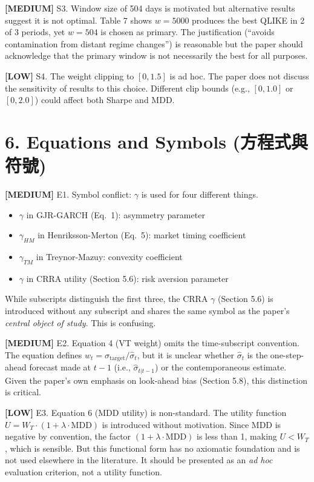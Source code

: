 \documentclass[12pt,a4paper]{article}
\newcommand{\med}[1]{\textcolor{warncolor}{\textbf{[MEDIUM]} #1}}
\newcommand{\low}[1]{\textcolor{okgreen}{\textbf{[LOW]} #1}}
\begin{document}
\med{S3. Window size of 504 days is motivated but alternative results suggest it is not optimal.} Table 7 shows $w = 5000$ produces the best QLIKE in 2 of 3 periods, yet $w = 504$ is chosen as primary. The justification (``avoids contamination from distant regime changes'') is reasonable but the paper should acknowledge that the primary window is not necessarily the best for all purposes.

\low{S4. The weight clipping to $[0, 1.5]$ is ad hoc.} The paper does not discuss the sensitivity of results to this choice. Different clip bounds (e.g., $[0, 1.0]$ or $[0, 2.0]$) could affect both Sharpe and MDD.


\section*{6. Equations and Symbols (方程式與符號)}

\med{E1. Symbol conflict: $\gamma$ is used for four different things.}
\begin{itemize}[nosep]
\item $\gamma$ in GJR-GARCH (Eq.\ 1): asymmetry parameter
\item $\gamma_{HM}$ in Henriksson-Merton (Eq.\ 5): market timing coefficient
\item $\gamma_{TM}$ in Treynor-Mazuy: convexity coefficient
\item $\gamma$ in CRRA utility (Section 5.6): risk aversion parameter
\end{itemize}
While subscripts distinguish the first three, the CRRA $\gamma$ (Section 5.6) is introduced without any subscript and shares the same symbol as the paper's \emph{central object of study}. This is confusing.

\med{E2. Equation 4 (VT weight) omits the time-subscript convention.} The equation defines $w_t = \sigma_{\text{target}} / \hat{\sigma}_t$, but it is unclear whether $\hat{\sigma}_t$ is the one-step-ahead forecast made at $t-1$ (i.e., $\hat{\sigma}_{t|t-1}$) or the contemporaneous estimate. Given the paper's own emphasis on look-ahead bias (Section 5.8), this distinction is critical.

\low{E3. Equation 6 (MDD utility) is non-standard.} The utility function $U = W_T \cdot (1 + \lambda \cdot \text{MDD})$ is introduced without motivation. Since MDD is negative by convention, the factor $(1 + \lambda \cdot \text{MDD})$ is less than 1, making $U < W_T$, which is sensible. But this functional form has no axiomatic foundation and is not used elsewhere in the literature. It should be presented as an \emph{ad hoc} evaluation criterion, not a utility function.
\end{document}
